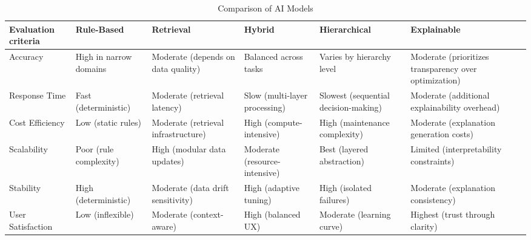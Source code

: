 \documentclass[conference]{IEEEtran}
\begin{document}
\begin{table}[h]
    \centering
    \caption{Comparison of AI Models}
    \label{tab:ai_models}
    \begin{tabular}{|>{\centering\arraybackslash}p{1.1cm}|>{\centering\arraybackslash}p{1.2cm}|>{\centering\arraybackslash}p{1.2cm}|>{\centering\arraybackslash}p{1.3cm}|>{\centering\arraybackslash}p{1.4cm}|>{\centering\arraybackslash}p{1.5cm}|}
    \hline
    \textbf{Evaluation criteria}  & \textbf{Rule-Based}                 & \textbf{Retrieval}                            & \textbf{Hybrid}\cite{b19}             & \textbf{Hierarchical} \cite{b18}                & \textbf{Explainable} \cite{b14} \cite{b17} \\ \hline
    Accuracy                      & High in narrow domains \cite{b14}   & Moderate (depends on data quality) \cite{b15} & Balanced across tasks                 & Varies by hierarchy level                 & Moderate (prioritizes transparency over optimization) \\ \hline
    Response Time \cite{b16}      & Fast (deterministic)                & Moderate (retrieval latency)                  & Slow (multi-layer processing)         & Slowest (sequential decision-making)      & Moderate (additional explainability overhead) \\ \hline
    Cost Efficiency               & Low (static rules)                  & Moderate (retrieval infrastructure)           & High (compute-intensive)              & High (maintenance complexity)             & Moderate (explanation generation costs) \\ \hline
    Scalability                   & Poor (rule complexity)              & High (modular data updates)                   & Moderate (resource-intensive)         & Best (layered abstraction)                & Limited (interpretability constraints) \\ \hline
    Stability                     & High (deterministic)                & Moderate (data drift sensitivity)             & High (adaptive tuning)                & High (isolated failures)                  & Moderate (explanation consistency) \\ \hline
    User Satisfaction             & Low (inflexible)                    & Moderate (context-aware)                      & High (balanced UX)                    & Moderate (learning curve)                 & Highest (trust through clarity) \\ \hline
    \end{tabular}
\end{table}
\end{document}
